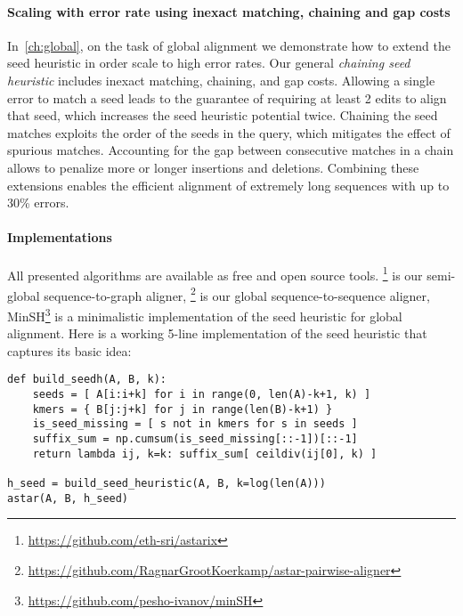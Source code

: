 \paragraph{Scaling with error rate using inexact matching, chaining and gap costs}
In~\cref{ch:global}, on the task of global alignment we demonstrate how to
extend the seed heuristic in order scale to high error rates. Our general
\emph{chaining seed heuristic} includes inexact matching, chaining, and gap
costs. Allowing a single error to match a seed leads to the guarantee of
requiring at least 2 edits to align that seed, which increases the seed
heuristic potential twice. Chaining the seed matches exploits the order of the
seeds in the query, which mitigates the effect of spurious matches. Accounting
for the gap between consecutive matches in a chain allows to penalize more or
longer insertions and deletions. Combining these extensions enables the
efficient alignment of extremely long sequences with up to 30\% errors. 

\paragraph{Implementations}
All presented algorithms are available as free and open source tools.
\astarix\footnote{\url{https://github.com/eth-sri/astarix}} is our semi-global
sequence-to-graph aligner,
\astarpa\footnote{\url{https://github.com/RagnarGrootKoerkamp/astar-pairwise-aligner}}
is our global sequence-to-sequence aligner,
MinSH\footnote{\url{https://github.com/pesho-ivanov/minSH}} is a minimalistic
implementation of the seed heuristic for global alignment. Here is a working
5-line implementation of the seed heuristic that captures its basic idea:

\begin{samepage}
\begin{verbatim}
def build_seedh(A, B, k):
    seeds = [ A[i:i+k] for i in range(0, len(A)-k+1, k) ]
    kmers = { B[j:j+k] for j in range(len(B)-k+1) }
    is_seed_missing = [ s not in kmers for s in seeds ]
    suffix_sum = np.cumsum(is_seed_missing[::-1])[::-1]
    return lambda ij, k=k: suffix_sum[ ceildiv(ij[0], k) ]

h_seed = build_seed_heuristic(A, B, k=log(len(A)))
astar(A, B, h_seed)
\end{verbatim}
\end{samepage}